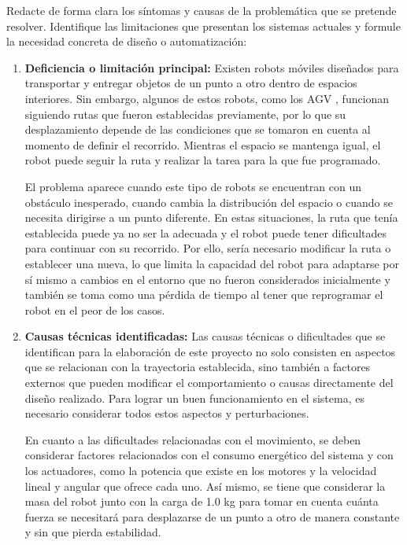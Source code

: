 Redacte de forma clara los síntomas y causas de la problemática que se pretende resolver. Identifique las limitaciones que presentan los sistemas actuales y formule la necesidad concreta de diseño o automatización:
\begin{enumerate}
    \item \textbf{Deficiencia o limitación principal:} Existen robots móviles diseñados para transportar y entregar objetos de un punto a otro dentro de espacios interiores. Sin embargo, algunos de estos robots, como los AGV \cite{MT2}, funcionan siguiendo rutas que fueron establecidas previamente, por lo que su desplazamiento depende de las condiciones que se tomaron en cuenta al momento de definir el recorrido. Mientras el espacio se mantenga igual, el robot puede seguir la ruta y realizar la tarea para la que fue programado.
    
    El problema aparece cuando este tipo de robots se encuentran con un obstáculo inesperado, cuando cambia la distribución del espacio o cuando se necesita dirigirse a un punto diferente. En estas situaciones, la ruta que tenía establecida puede ya no ser la adecuada y el robot puede tener dificultades para continuar con su recorrido. Por ello, sería necesario modificar la ruta o establecer una nueva, lo que limita la capacidad del robot para adaptarse por sí mismo a cambios en el entorno que no fueron considerados inicialmente y también se toma como una pérdida de tiempo al tener que reprogramar el robot en el peor de los casos.

    \item \textbf{Causas técnicas identificadas:} Las causas técnicas o dificultades que se identifican para la elaboración de este proyecto no solo consisten en aspectos que se relacionan con la trayectoria establecida, sino también a factores externos que pueden modificar el comportamiento o causas directamente del diseño realizado. Para lograr un buen funcionamiento en el sistema, es necesario considerar todos estos aspectos y perturbaciones.
    
    En cuanto a las dificultades relacionadas con el movimiento, se deben considerar factores relacionados con el consumo energético del sistema y con los actuadores, como la potencia que existe en los motores y la velocidad lineal y angular que ofrece cada uno. Así mismo, se tiene que considerar la masa del robot junto con la carga de 1.0 kg para tomar en cuenta cuánta fuerza se necesitará para desplazarse de un punto a otro de manera constante y sin que pierda estabilidad.
    

\end{enumerate}
